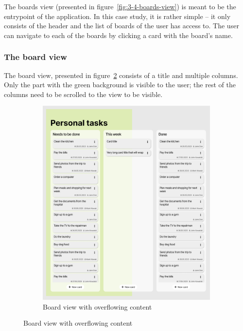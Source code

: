 The boards view (presented in figure~\ref{fig:3-4-boards-view}) is meant to be the entrypoint of the application.
In this case study, it is rather simple -- it only consists of the header and the list of boards of the user has access to.
The user can navigate to each of the boards by clicking a card with the board's name.

\subsubsection{The board view}
The board view, presented in figure~\ref{fig:3-4-board-view-expanded} consists of a title and multiple columns.
Only the part with the green background is visible to the user;
the rest of the columns need to be scrolled to the view to be visible.

\begin{figure}
    \centering
    \begin{subfigure}[m]{0.6\textwidth}
        \centering
        \includegraphics[height=0.4\textheight]{./3-research-methodology/board-view}
        \caption{Board view with overflowing content}
        \label{fig:3-4-board-view-expanded}
    \end{subfigure}

\end{figure}
